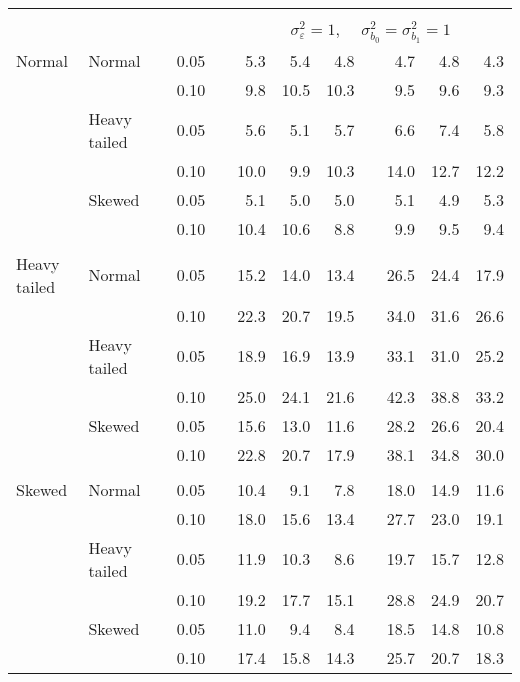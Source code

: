 \begin{table}[ht]
\begin{scriptsize}
\begin{tabular}{ll p{.1cm} c p{.1cm} rrr p{.1cm} rrr}
&&&&&&&&&&&\\
& && && \multicolumn{7}{c}{$\sigma_{\varepsilon}^2 = 1$, \ \ $\sigma_{b_0}^2 = \sigma_{b_1}^2 = 1$} \\ \cline{6-12}
\rowcolor{gray!20} Normal & Normal &  & 0.05 &  & 5.3 & 5.4 & 4.8 &  & 4.7 & 4.8 & 4.3 \\ 
\rowcolor{gray!20}    &  &  & 0.10 &  & 9.8 & 10.5 & 10.3 &  & 9.5 & 9.6 & 9.3 \\ 
\rowcolor{gray!20}    & Heavy tailed &  & 0.05 &  & 5.6 & 5.1 & 5.7 &  & 6.6 & 7.4 & 5.8 \\ 
\rowcolor{gray!20}    &  &  & 0.10 &  & 10.0 & 9.9 & 10.3 &  & 14.0 & 12.7 & 12.2 \\ 
\rowcolor{gray!20}    & Skewed &  & 0.05 &  & 5.1 & 5.0 & 5.0 &  & 5.1 & 4.9 & 5.3 \\ 
\rowcolor{gray!20}    &  &  & 0.10 &  & 10.4 & 10.6 & 8.8 &  & 9.9 & 9.5 & 9.4 \\ 
&&&&&&&&&&&\\
  Heavy tailed & Normal &  & 0.05 &  & 15.2 & 14.0 & 13.4 &  & 26.5 & 24.4 & 17.9 \\ 
   &  &  & 0.10 &  & 22.3 & 20.7 & 19.5 &  & 34.0 & 31.6 & 26.6 \\ 
   & Heavy tailed &  & 0.05 &  & 18.9 & 16.9 & 13.9 &  & 33.1 & 31.0 & 25.2 \\ 
   &  &  & 0.10 &  & 25.0 & 24.1 & 21.6 &  & 42.3 & 38.8 & 33.2 \\ 
   & Skewed &  & 0.05 &  & 15.6 & 13.0 & 11.6 &  & 28.2 & 26.6 & 20.4 \\ 
   &  &  & 0.10 &  & 22.8 & 20.7 & 17.9 &  & 38.1 & 34.8 & 30.0 \\ 
&&&&&&&&&&&\\
  Skewed & Normal &  & 0.05 &  & 10.4 & 9.1 & 7.8 &  & 18.0 & 14.9 & 11.6 \\ 
   &  &  & 0.10 &  & 18.0 & 15.6 & 13.4 &  & 27.7 & 23.0 & 19.1 \\ 
   & Heavy tailed &  & 0.05 &  & 11.9 & 10.3 & 8.6 &  & 19.7 & 15.7 & 12.8 \\ 
   &  &  & 0.10 &  & 19.2 & 17.7 & 15.1 &  & 28.8 & 24.9 & 20.7 \\ 
   & Skewed &  & 0.05 &  & 11.0 & 9.4 & 8.4 &  & 18.5 & 14.8 & 10.8 \\ 
   &  &  & 0.10 &  & 17.4 & 15.8 & 14.3 &  & 25.7 & 20.7 & 18.3 \\ 


\end{tabular}
\end{scriptsize}
\end{table}
